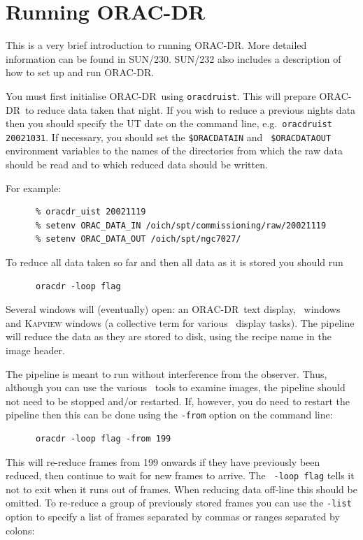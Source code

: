 \documentclass[twoside,11pt]{article}
\newcommand{\xref}[3]{#1}
\renewcommand{\_}{\texttt{\symbol{95}}}
\newcommand{\GAIA}{\xref{{\sc{Gaia}}}{sun214}{}}
\newcommand{\KAPPA}{\xref{{\sc{Kappa}}}{sun95}{}}
\newcommand{\ORACDR}{{\footnotesize ORAC-DR}}
\begin{document}
\section{Running ORAC-DR}

This is a very brief introduction to running \ORACDR. More detailed
information can be found in \xref{SUN/230}{sun230}{}.
\xref{SUN/232}{sun232}{} also includes a description of how to set up
and run \ORACDR.

You must first initialise \ORACDR\ using {\tt oracdr\_uist}. This will
prepare \ORACDR\ to reduce data taken that night. If
you wish to reduce a previous nights data then you should specify the
UT date on the command line, e.g.\ {\tt oracdr\_uist 20021031}. If
necessary, you should set the {\tt \$ORAC\_DATA\_IN} and {\tt
  \$ORAC\_DATA\_OUT} environment variables to the names of the
directories from which the raw data should be read and to which reduced
data should be written.

For example:

\begin{verbatim}
      % oracdr_uist 20021119
      % setenv ORAC_DATA_IN /oich/spt/commissioning/raw/20021119
      % setenv ORAC_DATA_OUT /oich/spt/ngc7027/
\end{verbatim}


To reduce all data taken so far and then all data as it is stored you
should run 

\begin{verbatim}
      oracdr -loop flag
\end{verbatim}

Several windows will (eventually) open: an \ORACDR\ text display, \GAIA\
windows and \textsc{Kapview} windows (a collective term for various
\KAPPA\ display tasks). The pipeline will reduce the data as they
are stored to disk, using the recipe name in the image header.

The pipeline is meant to run without interference from the observer.
Thus, although you can use the various \GAIA\ tools to examine images,
the pipeline should not need to be stopped and/or restarted. If,
however, you do need to restart the pipeline then this can be done
using the {\tt -from} option on the command line:

\begin{verbatim}
      oracdr -loop flag -from 199
\end{verbatim}

This will re-reduce frames from 199 onwards if they have previously
been reduced, then continue to wait for new frames to arrive. The {\tt
  -loop flag} tells it not to exit when it runs out of frames. When
reducing data off-line this should be omitted. To re-reduce a group of
previously stored frames you can use the {\tt -list} option to specify
a list of frames separated by commas or ranges separated by colons:
\end{document}
